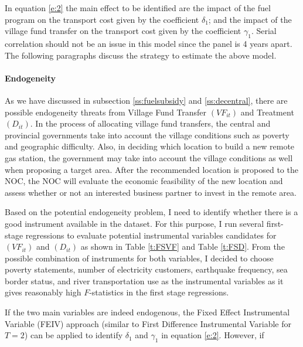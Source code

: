 \documentclass[letterpaper,12pt,leqno]{article}
\begin{document}
In equation \eqref{e:2} the main effect to be identified are the impact of the fuel program on the transport cost given by the coefficient $\delta_1$; and the impact of the village fund transfer on the transport cost given by the coefficient $\gamma_1$. Serial correlation should not be an issue in this model since the panel is 4 years apart. The following paragraphs discuss the strategy to estimate the above model.

\paragraph{Endogeneity} As we have discussed in subsection \ref{ss:fuelsubsidy} and \ref{ss:decentral}, there are possible endogeneity threats from Village Fund Transfer $(VF_{it})$ and Treatment $(D_{it})$. In the process of allocating village fund transfers, the central and provincial governments take into account the village conditions such as poverty and geographic difficulty. Also, in deciding which location to build a new remote gas station, the government may take into account the village conditions as well when proposing a target area. After the recommended location is proposed to the NOC, the NOC will evaluate the economic feasibility of the new location and assess whether or not an interested business partner to invest in the remote area. 

Based on the potential endogeneity problem, I need to identify whether there is a good instrument available in the dataset. For this purpose, I run several first-stage regressions to evaluate potential instrumental variables candidates for $(VF_{it})$ and $(D_{it})$ as shown in Table \ref{t:FSVF} and Table \ref{t:FSD}. From the possible combination of instruments for both variables, I decided to choose poverty statements, number of electricity customers, earthquake frequency, sea border status, and river transportation use as the instrumental variables as it gives reasonably high $F$-statistics in the first stage regressions.

If the two main variables are indeed endogenous, the Fixed Effect Instrumental Variable (FEIV) approach (similar to First Difference Instrumental Variable for $T=2$) can be applied to identify $\delta_1$ and $\gamma_1$ in equation \eqref{e:2}. However, if 
\end{document}
